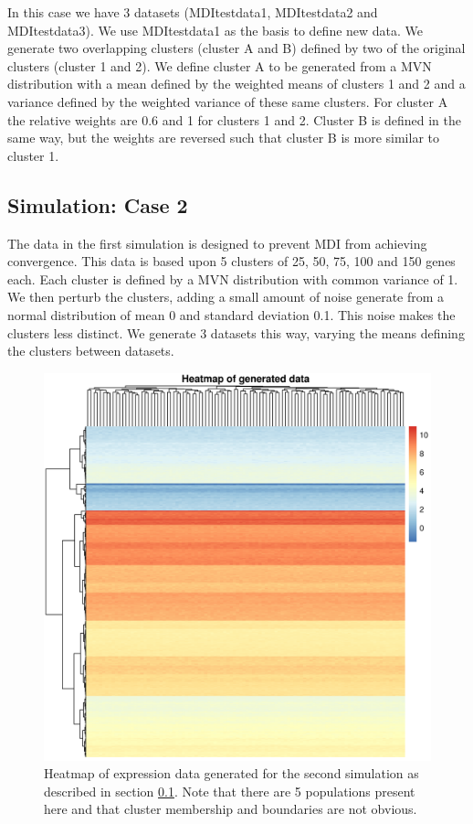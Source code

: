 \documentclass[12pt]{article} %
\begin{document}
	In this case we have 3 datasets (MDItestdata1, MDItestdata2 and MDItestdata3). We use MDItestdata1 as the basis to define new data. We generate two overlapping clusters (cluster A and B) defined by two of the original clusters (cluster  1 and 2). We define cluster A to be generated from a MVN distribution with a mean defined by the weighted means of clusters 1 and 2 and a variance defined by the weighted variance of these same clusters. For cluster A the relative weights are 0.6 and 1 for clusters 1 and 2. Cluster B is defined in the same way, but the weights are reversed such that cluster B is more similar to cluster 1.
	
	\subsection{Simulation: Case 2} \label{sec:sim:data:case_2}
	The data in the first simulation is designed to prevent MDI from achieving convergence. This data is based upon 5 clusters of 25, 50, 75, 100 and 150 genes each. Each cluster is defined by a MVN distribution with common variance of 1. We then perturb the clusters, adding a small amount of noise generate from a normal distribution of mean 0 and standard deviation 0.1. This noise makes the clusters less distinct. We generate 3 datasets this way, varying the means defining the clusters between datasets.
	
	\begin{figure}[!htb]
		\centering
		\includegraphics[scale=0.65]{Images/Gen_data/Case_2/data_pheatmap_0.png}
		\caption{Heatmap of expression data generated for the second simulation as described in section \ref{sec:sim:data:case_2}. Note that there are 5 populations present here and that cluster membership and boundaries are not obvious.}
		\label{fig:gen_data_sim_case_2}
	\end{figure}
\end{document}
